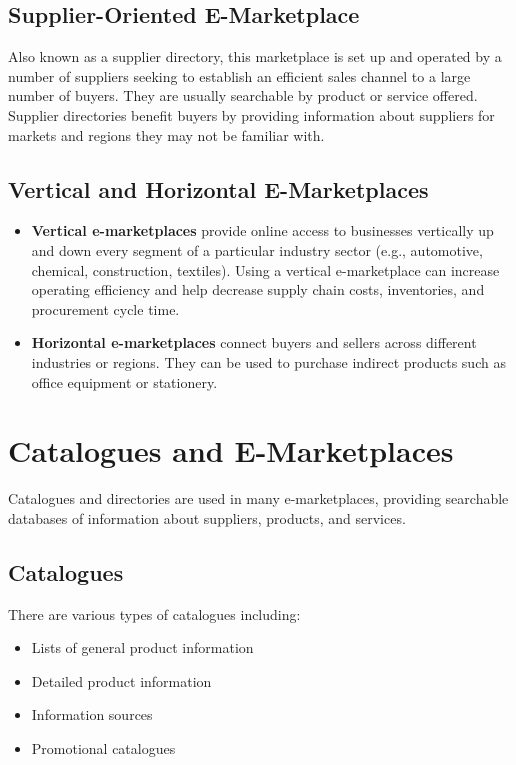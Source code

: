 \documentclass[12pt,a4paper]{article}
\begin{document}
\subsection{Supplier-Oriented E-Marketplace}
Also known as a supplier directory, this marketplace is set up and operated by a number of suppliers seeking to establish an efficient sales channel to a large number of buyers. They are usually searchable by product or service offered. Supplier directories benefit buyers by providing information about suppliers for markets and regions they may not be familiar with.

\subsection{Vertical and Horizontal E-Marketplaces}
\begin{itemize}
    \item \textbf{Vertical e-marketplaces} provide online access to businesses vertically up and down every segment of a particular industry sector (e.g., automotive, chemical, construction, textiles). Using a vertical e-marketplace can increase operating efficiency and help decrease supply chain costs, inventories, and procurement cycle time.
    \item \textbf{Horizontal e-marketplaces} connect buyers and sellers across different industries or regions. They can be used to purchase indirect products such as office equipment or stationery.
\end{itemize}

\section{Catalogues and E-Marketplaces}

Catalogues and directories are used in many e-marketplaces, providing searchable databases of information about suppliers, products, and services.

\subsection{Catalogues}
There are various types of catalogues including:
\begin{itemize}
    \item Lists of general product information
    \item Detailed product information
    \item Information sources
    \item Promotional catalogues
\end{itemize}
\end{document}
